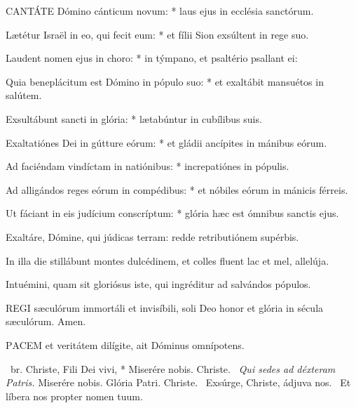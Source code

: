 
\lettrine[lines=2]{C}{ANTÁTE} Dómino cánticum novum: * laus ejus in ecclésia sanctórum.

Lætétur Israël in eo, qui fecit eum: * et fílii Sion exsúltent in rege suo.

Laudent nomen ejus in choro: * in týmpano, et psaltério psallant ei:

Quia beneplácitum est Dómino in pópulo suo: * et exaltábit mansuétos in salútem.

Exsultábunt sancti in glória: * lætabúntur in cubílibus suis.

Exaltatiónes Dei in gútture eórum: * et gládii ancípites in mánibus eórum.

Ad faciéndam vindíctam in natiónibus: * increpatiónes in pópulis.

Ad alligándos reges eórum in compédibus: * et nóbiles eórum in mánicis férreis.

Ut fáciant in eis judícium conscríptum: * glória hæc est ómnibus sanctis ejus.


  Exaltáre, Dómine, qui júdicas terram: redde retributiónem supérbis.


  In illa die stillábunt montes dulcédinem, et colles fluent lac et mel, allelúja.

  Intuémini, quam sit gloriósus iste, qui ingréditur ad salvándos pópulos.



\lettrine[lines=2]{R}{EGI} sæculórum immortáli et invisíbili, soli Deo honor et glória in sécula sæculórum. Amen.



\lettrine[lines=2]{P}{ACEM} et veritátem dilígite, ait Dóminus omnípotens.

\R\ br. Christe, Fili Dei vivi, * Miserére nobis. Christe. \V\ \textit{Qui sedes ad déxteram Patris.} Miserére nobis. Glória Patri. Christe. \V\ Exsúrge, Christe, ádjuva nos. \R\ Et líbera nos propter nomen tuum.

